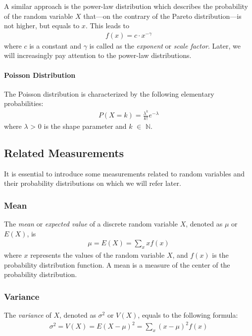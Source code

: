 A similar approach is the power-law distribution which describes the probability of the random variable $X$ that---on the contrary of the Pareto distribution---is not higher, but equals to $x$. This leads to
\begin{align}
	f(x) = c\cdot x^{-\gamma}
\end{align}
where $c$ is a constant and $\gamma$ is called as the \textit{exponent} or \textit{scale factor}. Later, we will increasingly pay attention to the power-law distributions.

\paragraph{Poisson Distribution}
The Poisson distribution is characterized by the following elementary probabilities:
\begin{align}
	P(X = k) = \frac{\lambda^k}{k!}e^{-\lambda}
\end{align}
where $\lambda$ > 0 is the shape parameter and $k$ $\in$ $\mathbb{N}$.


\subsection{Related Measurements}

It is essential to introduce some measurements related to random variables and their probability distributions on which we will refer later.
\subsubsection{Mean}
The \textit{mean} or \textit{expected value} of a discrete random variable $X$, denoted as $\mu$ or $E(X)$, is
\begin{align}
	\mu = E(X) = \sum_{x} xf(x)
\end{align}
where $x$ represents the values of the random variable $X$, and $f(x)$ is the probability distribution function. A mean is a measure of the center of the probability distribution.

\subsubsection{Variance}

The \textit{variance} of $X$, denoted as $\sigma^2$ or $V(X)$, equals to the following formula:
\begin{align}
	\sigma^2 = V(X) = E(X - \mu)^2 = \sum_{x}(x - \mu)^2 f(x)
\end{align}

